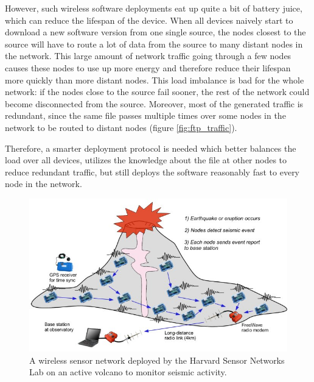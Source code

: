 \documentclass[ DIV=calc,%
                paper=a4,%
                fontsize=12pt,%
                twocolumn%
              ]{scrartcl}	 			%
\begin{document}
However, such wireless software deployments eat up quite a bit of battery juice, which can reduce the lifespan of the device. When all devices naively start to download a new software version from one single source, the nodes closest to the source will have to route a lot of data from the source to many distant nodes in the network. This large amount of network traffic going through a few nodes causes these nodes to use up more energy and therefore reduce their lifespan more quickly than more distant nodes. This load imbalance is bad for the whole network: if the nodes close to the source fail sooner, the rest of the network could become disconnected from the source. Moreover, most of the generated traffic is redundant, since the same file passes multiple times over some nodes in the network to be routed to distant nodes (figure \ref{fig:ftp_traffic}).

Therefore, a smarter deployment protocol is needed which better balances the load over all devices, utilizes the knowledge about the file at other nodes to reduce redundant traffic, but still deploys the software reasonably fast to every node in the network.

\begin{figure}
    \centering
    \includegraphics[width=\columnwidth]{images/reventador.jpg}
    \caption{A wireless sensor network deployed by the Harvard Sensor Networks Lab on an active volcano to monitor seismic activity. \cite{reventador}}
    \label{fig:reventador}
\end{figure}
\end{document}
